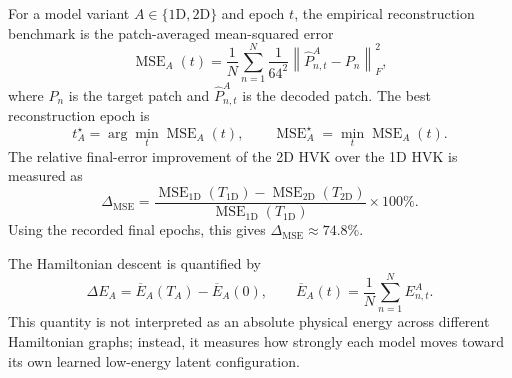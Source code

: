 \documentclass[11pt]{article}
\begin{document}
For a model variant $A \in \{\mathrm{1D},\mathrm{2D}\}$ and epoch $t$, the empirical reconstruction benchmark is the patch-averaged mean-squared error
\begin{equation}
\operatorname{MSE}_{A}(t)
=
\frac{1}{N}
\sum_{n=1}^{N}
\frac{1}{64^2}
\left\|
\widehat{P}_{n,t}^{A} - P_n
\right\|_F^2,
\end{equation}
where $P_n$ is the target patch and $\widehat{P}_{n,t}^{A}$ is the decoded patch. The best reconstruction epoch is
\begin{equation}
t_A^{\star} =
\arg\min_t \operatorname{MSE}_{A}(t),
\qquad
\operatorname{MSE}_{A}^{\star}
=
\min_t \operatorname{MSE}_{A}(t).
\end{equation}
The relative final-error improvement of the 2D HVK over the 1D HVK is measured as
\begin{equation}
\Delta_{\mathrm{MSE}}
=
\frac{
\operatorname{MSE}_{\mathrm{1D}}(T_{\mathrm{1D}})
-
\operatorname{MSE}_{\mathrm{2D}}(T_{\mathrm{2D}})
}{
\operatorname{MSE}_{\mathrm{1D}}(T_{\mathrm{1D}})
}
\times 100\%.
\end{equation}
Using the recorded final epochs, this gives $\Delta_{\mathrm{MSE}}\approx 74.8\%$.

The Hamiltonian descent is quantified by
\begin{equation}
\Delta E_A =
\overline{E}_A(T_A)-\overline{E}_A(0),
\qquad
\overline{E}_A(t)=\frac{1}{N}\sum_{n=1}^{N}E_{n,t}^{A}.
\end{equation}
This quantity is not interpreted as an absolute physical energy across different Hamiltonian graphs; instead, it measures how strongly each model moves toward its own learned low-energy latent configuration.
\end{document}
